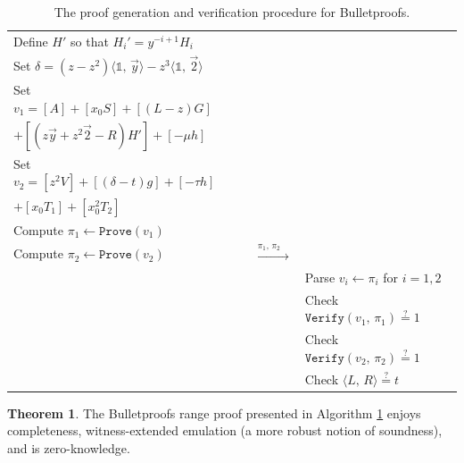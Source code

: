 \documentclass[11pt,letterpaper]{article}
\theoremstyle{definition}
\newtheorem{theorem}{Theorem}[subsection]
\newcommand{\6}{\mathbf}
\newcommand{\7}{\mathcal}
\newcommand{\ip}[2]{{\langle {#1}, \, {#2} \rangle}}
\newcommand{\one}{\mathbb{1}}
\begin{document}
\begin{table}[H]
\begin{tabular}{|lcl|}
    Define $H'$ so that $H_i' = y^{-i+1} H_i$ &&\\
    Set $\delta = (z - z^2) \ip{\one}{\vec{y}} - z^3 \ip{\one}{\vec{2}}$ &&\\

    Set $v_1 = [A] + [x_0 S] + [(L - z) G] $ &&\\
    \quad \quad $+ [(z \vec{y} + z^2 \vec{2} - R) H'] + [- \mu h]$ &&\\

    Set $v_2 = [z^2 V] + [(\delta - t) g] + [-\tau h]$ &&\\
    \quad \quad $+ [x_0 T_1] + [x_0^2 T_2]$ &&\\




    Compute $\pi_1 \leftarrow \texttt{Prove}(v_1)$ &&\\
    Compute $\pi_2 \leftarrow \texttt{Prove}(v_2)$ & $\xrightarrow{\quad \pi_1, \, \pi_2 \quad}$ &\\

    && Parse $v_i \leftarrow \pi_i$ for $i = 1, 2$ \\
    && Check $\texttt{Verify}(v_1, \, \pi_1) \stackrel{?}{=} 1$ \\
    && Check $\texttt{Verify}(v_2, \, \pi_2) \stackrel{?}{=} 1$ \\
    && Check $\ip{L}{R} \stackrel{?}{=} t$ \\
    \hline
    \end{tabular}
    \smallskip
    \caption{The proof generation and verification procedure for Bulletproofs.}
    \label{alg:BPMain}
\end{table}





\begin{theorem}
    The Bulletproofs range proof presented in Algorithm \ref{alg:BPMain} enjoys completeness, witness-extended emulation (a more robust notion of soundness), and is zero-knowledge.
\end{theorem}
\end{document}
